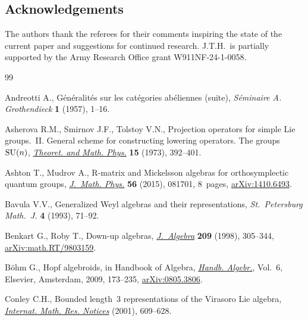 \documentclass[pdftex]{sigma}
\numberwithin{equation}{section}
\begin{document}
\subsection*{Acknowledgements}
The authors thank the referees for their comments inspiring the state of the current paper and suggestions for continued research.
J.T.H.\ is partially supported by the Army Research Office grant W911NF-24-1-0058.

\begin{thebibliography}{99}
\footnotesize\itemsep=0pt

Andreotti A., G\'en\'eralit\'es sur les cat\'egories ab\'eliennes (suite),
 \textit{S\'eminaire A. Grothendieck} \textbf{1} (1957), 1--16.

Asherova R.M., Smirnov J.F., Tolstoy V.N., Projection operators for simple
 {L}ie groups.~{II}. {G}eneral scheme for constructing lowering operators.
 {T}he groups~{${\rm SU}(n)$}, \href{https://doi.org/10.1007/BF01028268}{\textit{Theoret. and Math. Phys.}} \textbf{15}
 (1973), 392--401.

Ashton T., Mudrov A., R-matrix and {M}ickelsson algebras for orthosymplectic
 quantum groups, \href{https://doi.org/10.1063/1.4927582}{\textit{J.~Math. Phys.}} \textbf{56} (2015), 081701, 8~pages,
 \href{https://arxiv.org/abs/1410.6493}{arXiv:1410.6493}.

Bavula V.V., Generalized {W}eyl algebras and their representations,
 \textit{St.~Petersburg Math.~J.} \textbf{4} (1993), 71--92.

Benkart G., Roby T., Down-up algebras, \href{https://doi.org/10.1006/jabr.1998.7511}{\textit{J.~Algebra}} \textbf{209} (1998),
 305--344, \href{https://arxiv.org/abs/math.RT/9803159}{arXiv:math.RT/9803159}.

B\"ohm G., Hopf algebroids, in Handbook of {A}lgebra, \href{https://doi.org/10.1016/S1570-7954(08)00205-2}{\textit{Handb. Algebr.}},
 Vol.~6, Elsevier, Amsterdam, 2009, 173--235, \href{https://arxiv.org/abs/0805.3806}{arXiv:0805.3806}.

Conley C.H., Bounded length~3 representations of the {V}irasoro {L}ie algebra,
 \href{https://doi.org/10.1155/S1073792801000320}{\textit{Internat. Math. Res. Notices}} (2001), 609--628.


\end{thebibliography}
\end{document}
